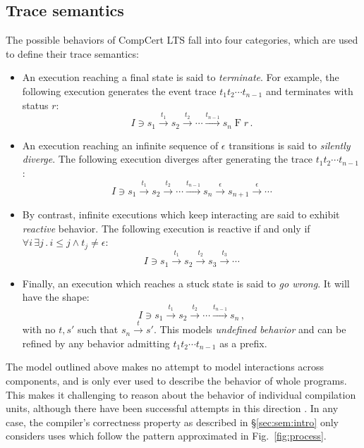 \documentclass[draft,11pt]{report}
\begin{document}
\subsection{Trace semantics}

The possible behaviors of CompCert LTS fall into four categories,
which are used to define their trace semantics:
\begin{itemize}
\item An execution reaching a final state is said to
    \emph{terminate}.
    For example,
    the following execution generates
    the event trace $t_1 t_2 \cdots t_{n-1}$
    and terminates with status $r$:
    \[
        I \ni s_1 \stackrel{t_1}{\rightarrow}
          s_2 \stackrel{t_2}{\rightarrow}
          \cdots \stackrel{t_{n-1}}{\rightarrow}
          s_n \mathrel{F} r \,.
    \]
\item An execution reaching
    an infinite sequence of $\epsilon$ transitions
    is said to \emph{silently diverge}.
    The following execution diverges after
    generating the trace $t_1 t_2 \cdots t_{n-1}$:
    \[
        I \ni s_1 \stackrel{t_1}{\rightarrow}
          s_2 \stackrel{t_2}{\rightarrow}
          \cdots \stackrel{t_{n-1}}{\rightarrow}
          s_n \stackrel{\epsilon}{\rightarrow}
          s_{n+1} \stackrel{\epsilon}{\rightarrow}
          \cdots
    \]
\item By contrast,
    infinite executions which keep interacting
    are said to exhibit \emph{reactive} behavior.
    The following execution
    is reactive if and only if
    $\forall i \, \exists j \,.\, i \le j \wedge t_j \ne \epsilon$:
    \[
        I \ni s_1 \stackrel{t_1}{\rightarrow}
          s_2 \stackrel{t_2}{\rightarrow}
          s_3 \stackrel{t_3}{\rightarrow}
          \cdots
    \]
\item Finally, an execution which reaches a stuck state
    is said to \emph{go wrong}. It will have the shape:
    \[
        I \ni s_1 \stackrel{t_1}{\rightarrow}
          s_2 \stackrel{t_2}{\rightarrow}
          \cdots \stackrel{t_{n-1}}{\rightarrow}
          s_n \,,
    \]
    with no $t, s'$ such that
    $s_n \stackrel{t}{\rightarrow} s'$.
    This models \emph{undefined behavior}
    and can be refined by any behavior
    admitting $t_1 t_2 \cdots t_{n-1}$ as a prefix.
\end{itemize}

The model outlined above
makes no attempt to model interactions across components,
and is only ever used to
describe the behavior of whole programs.
This makes it challenging to reason about
the behavior of individual compilation units,
although there have been successful attempts in this direction
\citep{sepcompcert,compcertm}.
In any case,
the compiler's correctness property
as described in \S\ref{sec:sem:intro}
only considers uses which follow
the pattern approximated in Fig.~\ref{fig:process}.
\end{document}
